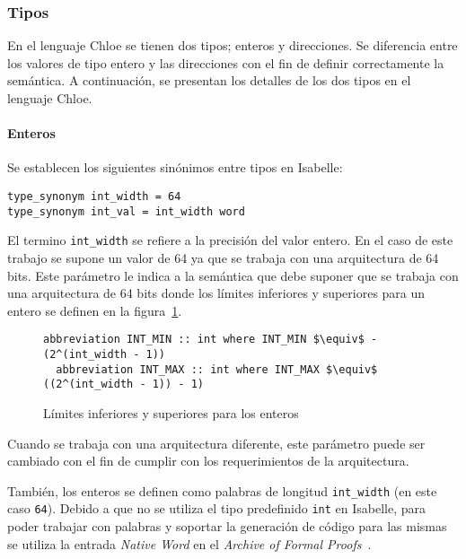 \subsubsection*{Tipos}

En el lenguaje Chloe se tienen dos tipos; enteros y direcciones.
Se diferencia entre los valores de tipo entero y las direcciones con el fin de definir correctamente la semántica.
A continuación, se presentan los detalles de los dos tipos en el lenguaje Chloe.

\paragraph*{Enteros}

Se establecen los siguientes sinónimos entre tipos en Isabelle:

\begin{lstlisting}[frame=single]
type_synonym int_width = 64
type_synonym int_val = int_width word
\end{lstlisting}


El termino \verb|int_width| se refiere a la precisión del valor entero.
En el caso de este trabajo se supone un valor de 64 ya que se trabaja con una arquitectura de 64 bits.
Este parámetro le indica a la semántica que debe suponer que se trabaja con una arquitectura de 64 bits donde los límites inferiores y superiores para un entero se definen en la figura~\ref{fig:int_bounds}.

\begin{figure}
  \begin{lstlisting}[frame=single, mathescape=true]
  abbreviation INT_MIN :: int where INT_MIN $\equiv$ - (2^(int_width - 1))
  abbreviation INT_MAX :: int where INT_MAX $\equiv$  ((2^(int_width - 1)) - 1)
  \end{lstlisting}

  \caption{Límites inferiores y superiores para los enteros}
  \label{fig:int_bounds}
\end{figure}

Cuando se trabaja con una arquitectura diferente, este parámetro puede ser cambiado con el fin de cumplir con los requerimientos de la arquitectura.

También, los enteros se definen como palabras de longitud \verb|int_width| (en este caso \verb|64|).
Debido a que no se utiliza el tipo predefinido \verb|int| en Isabelle, para poder trabajar con palabras y soportar la generación de código para las mismas se utiliza la entrada \textit{Native Word} en el \textit{Archive of Formal Proofs}~\citep{Native_Word-AFP}.

